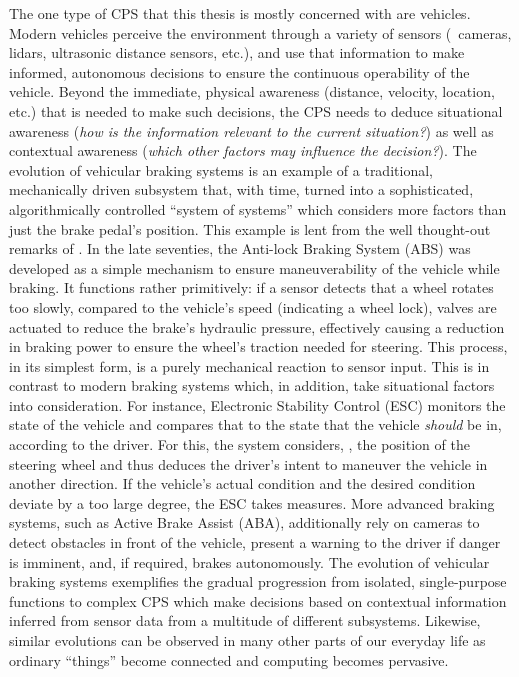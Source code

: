 The one type of CPS that this thesis is mostly concerned with are vehicles. Modern vehicles perceive the environment through a variety of sensors (\eg\ cameras, lidars, ultrasonic distance sensors, etc.), and use that information to make informed, autonomous decisions to ensure the continuous operability of the vehicle.  
Beyond the immediate, physical awareness (distance, velocity, location, etc.) that is needed to make such decisions, the CPS needs to deduce situational awareness (\emph{how is the information relevant to the current situation?}) as well as contextual awareness (\emph{which other factors may influence the decision?}). 
The evolution of vehicular braking systems is an example of a traditional, mechanically driven subsystem that, with time, turned into a sophisticated, algorithmically controlled ``system of systems'' which considers more factors than just the brake pedal's position. This example is lent from the well thought-out remarks of \citeauthor{broy2012cyber} \cite{broy2012cyber}.
In the late seventies, the Anti-lock Braking System (ABS) was developed as a simple mechanism to ensure maneuverability of the vehicle while braking. It functions rather primitively: if a sensor detects that a wheel rotates too slowly, compared to the vehicle's speed (indicating a wheel lock), valves are actuated to reduce the brake's hydraulic pressure, effectively causing a reduction in braking power to ensure the wheel's traction needed for steering. This process, in its simplest form, is a purely mechanical reaction to sensor input.
This is in contrast to modern braking systems which, in addition, take situational factors into consideration. For instance, Electronic Stability Control (ESC) monitors the state of the vehicle and compares that to the state that the vehicle \emph{should} be in, according to the driver. For this, the system considers, \eg , the position of the steering wheel and thus deduces the driver's intent to maneuver the vehicle in another direction. If the vehicle's actual condition and the desired condition deviate by a too large degree, the ESC takes measures. More advanced braking systems, such as Active Brake Assist (ABA), additionally rely on cameras to detect obstacles in front of the vehicle, present a warning to the driver if danger is imminent, and, if required, brakes autonomously.
The evolution of vehicular braking systems exemplifies the gradual progression from isolated, single-purpose functions to complex CPS which make decisions based on contextual information inferred from sensor data from a multitude of different subsystems. Likewise, similar evolutions can be observed in many other parts of our everyday life as ordinary ``things'' become connected and computing becomes pervasive.

